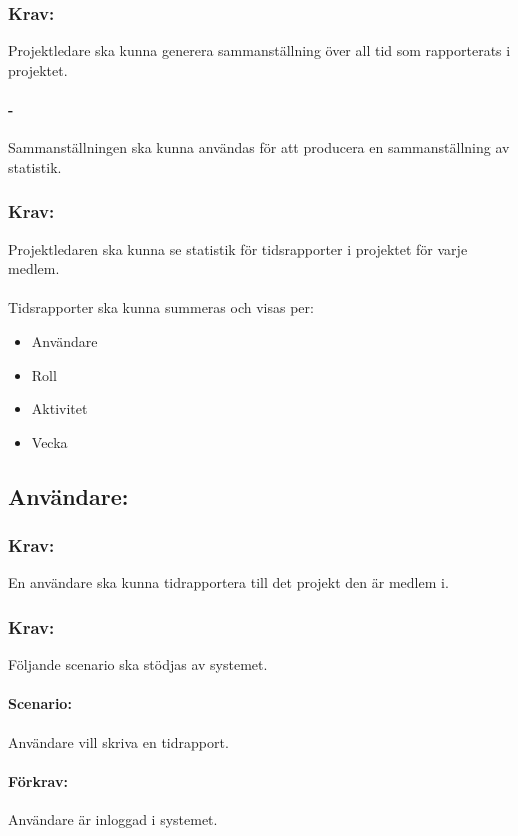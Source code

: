 \documentclass[paper=a4, fontsize=11pt,twoside]{article}
\begin{document}
	\paragraph{}
	
	\subsubsection*{Krav:}
	Projektledare ska kunna generera sammanställning över all tid som rapporterats i projektet.
	\paragraph{-}
	Sammanställningen ska kunna användas för att producera en sammanställning av statistik.
	
	\subsubsection*{Krav:}
	Projektledaren ska kunna se statistik för tidsrapporter i projektet för varje medlem.
	\paragraph{}
	Tidsrapporter ska kunna summeras och visas per:
	\begin{itemize}
		\item Användare
		\item Roll
		\item Aktivitet
		\item Vecka
	\end{itemize}
	\subsection{Användare:}
	\subsubsection{Krav:} En användare ska kunna tidrapportera till det projekt den är medlem i.
	\subsubsection{Krav:} Följande scenario ska stödjas av systemet.
	\paragraph{Scenario:} Användare vill skriva en tidrapport.
	\paragraph{Förkrav:}
	Användare är inloggad i systemet.
	
\end{document}
